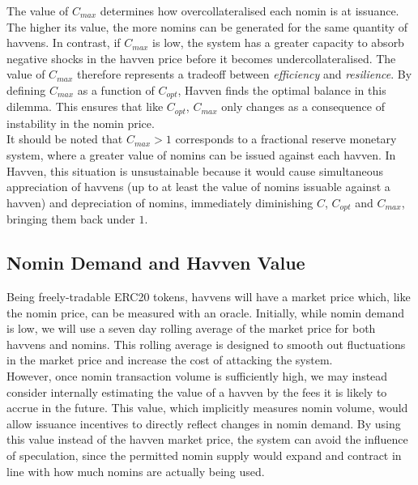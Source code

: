 \noindent The value of $C_{max}$ determines how overcollateralised each nomin is at issuance. The higher its value, the more nomins can be generated for the same quantity of havvens. In contrast, if $C_{max}$ is low, the system has a greater capacity to absorb negative shocks in the havven price before it becomes undercollateralised.  The value of $C_{max}$ therefore represents a tradeoff between \textit{efficiency} and \textit{resilience}. By defining $C_{max}$ as a function of $C_{opt}$, Havven finds the optimal balance in this dilemma. This ensures that like $C_{opt}$, $C_{max}$ only changes as a consequence of instability in the nomin price. \\

\noindent It should be noted that $C_{max} > 1$ corresponds to a fractional reserve monetary
system, where a greater value of nomins can be issued against each havven. In Havven, this
situation is unsustainable because it would cause simultaneous appreciation of havvens (up to at
least the value of nomins issuable against a havven) and depreciation of nomins, immediately
diminishing $C$, $C_{opt}$ and $C_{max}$, bringing them back under $1$.

\newpage

\subsection{Nomin Demand and Havven Value}

\noindent Being freely-tradable ERC20 tokens, havvens will have a market price which, like
the nomin price, can be measured with an oracle.
Initially, while nomin demand is low, we will use a seven day rolling average of the market price for both havvens and nomins.
This rolling average is designed to smooth out fluctuations in the market price and increase the cost of attacking the system.\\

\noindent However, once nomin transaction volume is sufficiently high, we may instead consider internally estimating
the value of a havven by the fees it is likely to accrue in the future. This value, which implicitly measures nomin volume,
would allow issuance incentives to directly reflect changes in nomin demand.
By using this value instead of the havven market price, the system can avoid the influence of speculation,
since the permitted nomin supply would expand and contract in line with how much nomins are actually being used. \\

